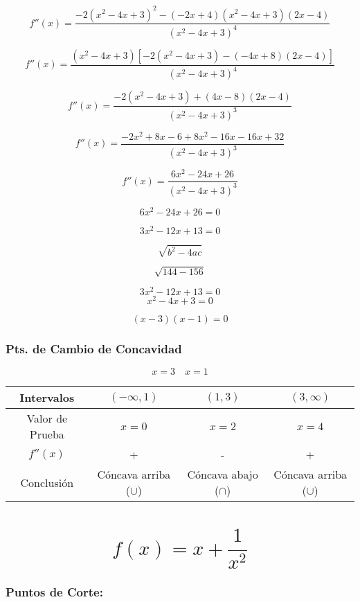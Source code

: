 \[
f''(x) = \frac{-2 (x^2 - 4x + 3)^2 - (-2x + 4) (x^2 - 4x + 3) (2x - 4)}{(x^2 - 4x + 3)^4}
\]

\[
f''(x) = \frac{(x^2 - 4x + 3) \left[ -2 (x^2 - 4x + 3) - (-4x + 8) (2x - 4) \right]}{(x^2 - 4x + 3)^4}
\]

\[
f''(x) = \frac{-2 (x^2 - 4x + 3) + (4x - 8) (2x - 4)}{(x^2 - 4x + 3)^3}
\]

\[
f''(x) = \frac{-2x^2 + 8x - 6 + 8x^2 - 16x - 16x + 32}{(x^2 - 4x + 3)^3}
\]

\[
f''(x) = \frac{6x^2 - 24x + 26}{(x^2 - 4x + 3)^3}
\]

\[
6x^2 - 24x + 26 = 0
\]

\[
3x^2 - 12x + 13 = 0
\]

\[
\sqrt{b^2 - 4ac}
\]

\[
\sqrt{144 - 156}
\]

\[
3x^2 - 12x + 13 = 0
\]
\[
x^2 - 4x + 3 = 0
\]

\[
(x - 3)(x - 1) = 0
\]

\subsubsection*{Pts. de Cambio de Concavidad}

\[
x = 3 \quad x = 1
\]

\begin{center}
    \begin{tabular}{|c|c|c|c|}
        \hline
        Intervalos & $(-\infty,1)$ & $(1,3)$ & $(3,\infty)$ \\
        \hline
        Valor de Prueba & $x=0$ & $x=2$ & $x=4$ \\
        \hline
        $f''(x)$ & + & - & + \\
        \hline
        Conclusión & Cóncava arriba ($\cup$) & Cóncava abajo ($\cap$) & Cóncava arriba ($\cup$) \\
        \hline
    \end{tabular}
\end{center}

\begin{figure}[H]
    \centering
    
\end{figure}

\section*{\[f(x) = x + \frac{1}{x^2}\]}

\subsubsection*{Puntos de Corte:}

